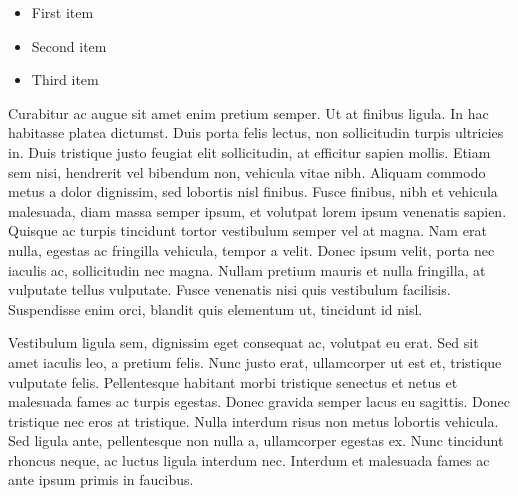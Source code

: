 \begin{itemize}
\color{ForestGreen}
\item First item
\item Second item
\item Third item
\end{itemize}

Curabitur ac augue sit amet enim pretium semper. Ut at finibus ligula. In hac habitasse platea dictumst. Duis porta felis lectus, non sollicitudin turpis ultricies in. Duis tristique justo feugiat elit sollicitudin, at efficitur sapien mollis. Etiam sem nisi, hendrerit vel bibendum non, vehicula vitae nibh. Aliquam commodo metus a dolor dignissim, sed lobortis nisl finibus. Fusce finibus, nibh et vehicula malesuada, diam massa semper ipsum, et volutpat lorem ipsum venenatis sapien. Quisque ac turpis tincidunt tortor vestibulum semper vel at magna. Nam erat nulla, egestas ac fringilla vehicula, tempor a velit. Donec ipsum velit, porta nec iaculis ac, sollicitudin nec magna. Nullam pretium mauris et nulla fringilla, at vulputate tellus vulputate. Fusce venenatis nisi quis vestibulum facilisis. Suspendisse enim orci, blandit quis elementum ut, tincidunt id nisl.

Vestibulum ligula sem, dignissim eget consequat ac, volutpat eu erat. Sed sit amet iaculis leo, a pretium felis. Nunc justo erat, ullamcorper ut est et, tristique vulputate felis. Pellentesque habitant morbi tristique senectus et netus et malesuada fames ac turpis egestas. Donec gravida semper lacus eu sagittis. Donec tristique nec eros at tristique. Nulla interdum risus non metus lobortis vehicula. Sed ligula ante, pellentesque non nulla a, ullamcorper egestas ex. Nunc tincidunt rhoncus neque, ac luctus ligula interdum nec. Interdum et malesuada fames ac ante ipsum primis in faucibus.

\newpage

